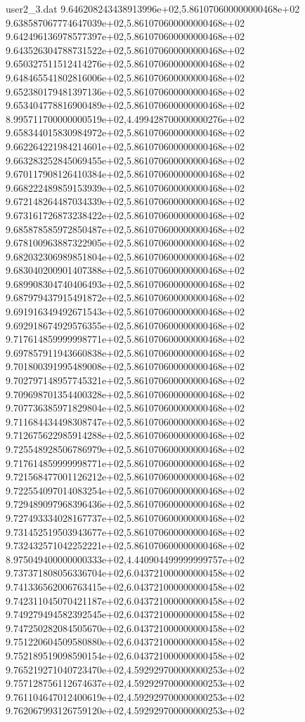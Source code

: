 \begin{filecontents}{user2_3.dat}
9.646208243438913996e+02,5.861070600000000468e+02
9.638587067774647039e+02,5.861070600000000468e+02
9.642496136978577397e+02,5.861070600000000468e+02
9.643526304788731522e+02,5.861070600000000468e+02
9.650327511512414276e+02,5.861070600000000468e+02
9.648465541802816006e+02,5.861070600000000468e+02
9.652380179481397136e+02,5.861070600000000468e+02
9.653404778816900489e+02,5.861070600000000468e+02
8.995711700000000519e+02,4.499428700000000276e+02
9.658344015830984972e+02,5.861070600000000468e+02
9.662264221984214601e+02,5.861070600000000468e+02
9.663283252845069455e+02,5.861070600000000468e+02
9.670117908126410384e+02,5.861070600000000468e+02
9.668222489859153939e+02,5.861070600000000468e+02
9.672148264487034339e+02,5.861070600000000468e+02
9.673161726873238422e+02,5.861070600000000468e+02
9.685878585972850487e+02,5.861070600000000468e+02
9.678100963887322905e+02,5.861070600000000468e+02
9.682032306989851804e+02,5.861070600000000468e+02
9.683040200901407388e+02,5.861070600000000468e+02
9.689908304740406493e+02,5.861070600000000468e+02
9.687979437915491872e+02,5.861070600000000468e+02
9.691916349492671543e+02,5.861070600000000468e+02
9.692918674929576355e+02,5.861070600000000468e+02
9.717614859999998771e+02,5.861070600000000468e+02
9.697857911943660838e+02,5.861070600000000468e+02
9.701800391995489008e+02,5.861070600000000468e+02
9.702797148957745321e+02,5.861070600000000468e+02
9.709698701354400328e+02,5.861070600000000468e+02
9.707736385971829804e+02,5.861070600000000468e+02
9.711684434498308747e+02,5.861070600000000468e+02
9.712675622985914288e+02,5.861070600000000468e+02
9.725548928506786979e+02,5.861070600000000468e+02
9.717614859999998771e+02,5.861070600000000468e+02
9.721568477001126212e+02,5.861070600000000468e+02
9.722554097014083254e+02,5.861070600000000468e+02
9.729489097968396436e+02,5.861070600000000468e+02
9.727493334028167737e+02,5.861070600000000468e+02
9.731452519503943677e+02,5.861070600000000468e+02
9.732432571042252221e+02,5.861070600000000468e+02
8.975049400000000333e+02,4.440904499999999757e+02
9.737371808056336704e+02,6.043721000000000458e+02
9.741336562006763415e+02,6.043721000000000458e+02
9.742311045070421187e+02,6.043721000000000458e+02
9.749279494582392545e+02,6.043721000000000458e+02
9.747250282084505670e+02,6.043721000000000458e+02
9.751220604509580880e+02,6.043721000000000458e+02
9.752189519098590154e+02,6.043721000000000458e+02
9.765219271040723470e+02,4.592929700000000253e+02
9.757128756112674637e+02,4.592929700000000253e+02
9.761104647012400619e+02,4.592929700000000253e+02
9.762067993126759120e+02,4.592929700000000253e+02

\end{filecontents}
